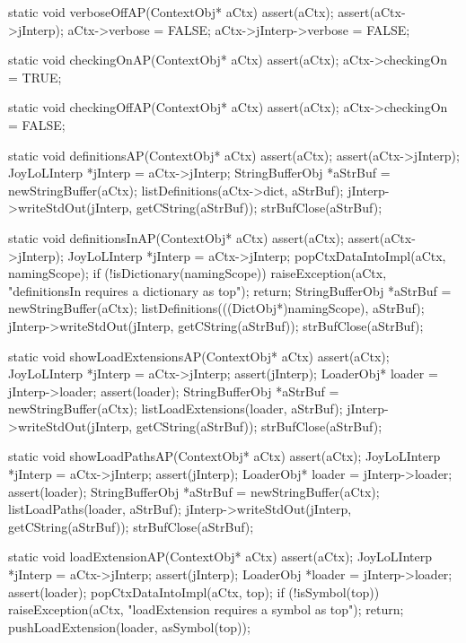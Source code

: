 \startCCode
static void verboseOffAP(ContextObj* aCtx) {
  assert(aCtx);
  assert(aCtx->jInterp);
  aCtx->verbose = FALSE;
  aCtx->jInterp->verbose = FALSE;
}
\stopCCode

\startCCode
static void checkingOnAP(ContextObj* aCtx) {
  assert(aCtx);
  aCtx->checkingOn = TRUE;
}
\stopCCode

\startCCode
static void checkingOffAP(ContextObj* aCtx) {
  assert(aCtx);
  aCtx->checkingOn = FALSE;
}
\stopCCode

\startCCode
static void definitionsAP(ContextObj* aCtx) {
  assert(aCtx);
  assert(aCtx->jInterp);
  JoyLoLInterp *jInterp = aCtx->jInterp;
  StringBufferObj *aStrBuf = newStringBuffer(aCtx);
  listDefinitions(aCtx->dict, aStrBuf);
  jInterp->writeStdOut(jInterp, getCString(aStrBuf));
  strBufClose(aStrBuf);
}
\stopCCode

\startCCode
static void definitionsInAP(ContextObj* aCtx) {
  assert(aCtx);
  assert(aCtx->jInterp);
  JoyLoLInterp *jInterp = aCtx->jInterp;
  popCtxDataIntoImpl(aCtx, namingScope);
  if (!isDictionary(namingScope)) {
    raiseException(aCtx,
      "definitionsIn requires a dictionary as top");
    return;
  }
  StringBufferObj *aStrBuf = newStringBuffer(aCtx);
  listDefinitions(((DictObj*)namingScope), aStrBuf);
  jInterp->writeStdOut(jInterp, getCString(aStrBuf));
  strBufClose(aStrBuf);
}
\stopCCode

\startCCode
static void showLoadExtensionsAP(ContextObj* aCtx) {
  assert(aCtx);
  JoyLoLInterp *jInterp = aCtx->jInterp;
  assert(jInterp);
  LoaderObj* loader = jInterp->loader;
  assert(loader);
  StringBufferObj *aStrBuf = newStringBuffer(aCtx);
  listLoadExtensions(loader, aStrBuf);
  jInterp->writeStdOut(jInterp, getCString(aStrBuf));
  strBufClose(aStrBuf);
}
\stopCCode

\startCCode
static void showLoadPathsAP(ContextObj* aCtx) {
  assert(aCtx);
  JoyLoLInterp *jInterp = aCtx->jInterp;
  assert(jInterp);
  LoaderObj* loader = jInterp->loader;
  assert(loader);
  StringBufferObj *aStrBuf = newStringBuffer(aCtx);
  listLoadPaths(loader, aStrBuf);
  jInterp->writeStdOut(jInterp, getCString(aStrBuf));
  strBufClose(aStrBuf);
}
\stopCCode

\startCCode
static void loadExtensionAP(ContextObj* aCtx) {
  assert(aCtx);
  JoyLoLInterp *jInterp = aCtx->jInterp;
  assert(jInterp);
  LoaderObj *loader = jInterp->loader;
  assert(loader);
  popCtxDataIntoImpl(aCtx, top);
  if (!isSymbol(top)) {
    raiseException(aCtx,
      "loadExtension requires a symbol as top");
    return;
  }
  pushLoadExtension(loader, asSymbol(top));
}
\stopCCode

